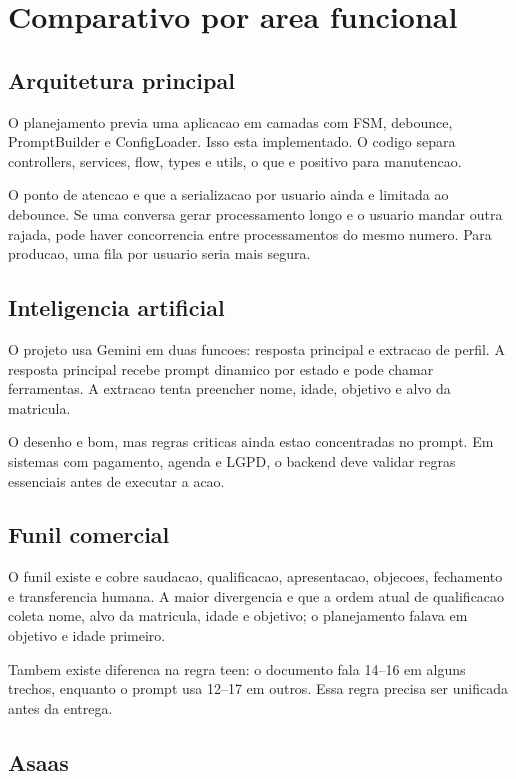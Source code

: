 \documentclass[11pt,a4paper]{article}
\begin{document}
\section{Comparativo por area funcional}

\subsection{Arquitetura principal}

O planejamento previa uma aplicacao em camadas com FSM, debounce, PromptBuilder e ConfigLoader. Isso esta implementado. O codigo separa controllers, services, flow, types e utils, o que e positivo para manutencao.

O ponto de atencao e que a serializacao por usuario ainda e limitada ao debounce. Se uma conversa gerar processamento longo e o usuario mandar outra rajada, pode haver concorrencia entre processamentos do mesmo numero. Para producao, uma fila por usuario seria mais segura.

\subsection{Inteligencia artificial}

O projeto usa Gemini em duas funcoes: resposta principal e extracao de perfil. A resposta principal recebe prompt dinamico por estado e pode chamar ferramentas. A extracao tenta preencher nome, idade, objetivo e alvo da matricula.

O desenho e bom, mas regras criticas ainda estao concentradas no prompt. Em sistemas com pagamento, agenda e LGPD, o backend deve validar regras essenciais antes de executar a acao.

\subsection{Funil comercial}

O funil existe e cobre saudacao, qualificacao, apresentacao, objecoes, fechamento e transferencia humana. A maior divergencia e que a ordem atual de qualificacao coleta nome, alvo da matricula, idade e objetivo; o planejamento falava em objetivo e idade primeiro.

Tambem existe diferenca na regra teen: o documento fala 14--16 em alguns trechos, enquanto o prompt usa 12--17 em outros. Essa regra precisa ser unificada antes da entrega.

\subsection{Asaas}
\end{document}
